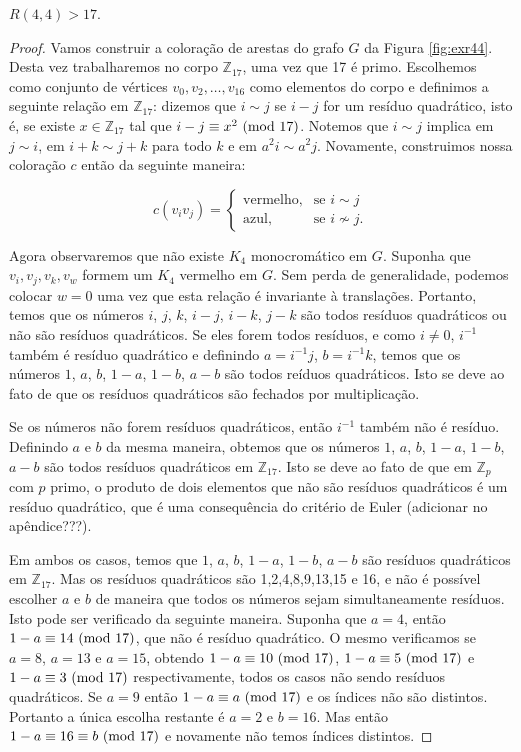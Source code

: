 \begin{proposition}
\label{thm:exr44}
$R(4,4) > 17$.
\end{proposition}
\begin{proof}
Vamos construir a coloração de arestas do grafo $G$ da Figura \ref{fig:exr44}. Desta vez trabalharemos no corpo $\mathbb{Z}_{17}$, uma vez que 17 é primo. Escolhemos como conjunto de vértices $v_0, v_2, \dots, v_{16}$ como elementos do corpo e definimos a seguinte relação em $\mathbb{Z}_{17}$: dizemos que $i \sim j$ se $ i - j $ for um resíduo quadrático, isto é, se existe $x \in \mathbb{Z}_{17}$ tal que $i - j \equiv x^2 \ (\text{mod}\ 17)$.
Notemos que $i \sim j$ implica em $ j \sim i$, em $i + k \sim j + k$ para todo $k$ e em $a^2 i \sim a^2 j$. Novamente, construimos nossa coloração $c$ então da seguinte maneira:

\[c(v_i v_j) = \begin{cases}
  \text{vermelho}, & \text{se } i \sim j \\
  \text{azul}, & \text{se } i \not\sim j.
\end{cases}\]

Agora observaremos que não existe $K_4$ monocromático em $G$. Suponha que $v_i, v_j, v_k, v_w$ formem um $K_4$ vermelho em $G$. Sem perda de generalidade, podemos colocar $w = 0$ uma vez que esta relação é invariante à translações. Portanto, temos que os números $i$, $j$, $k$, $i - j$, $i - k$, $j - k$ são todos resíduos quadráticos ou não são resíduos quadráticos.
Se eles forem todos resíduos, e como $i \neq 0$, $i^{-1}$ também é resíduo quadrático e definindo $a = i^{-1}j$, $b = i^{-1}k$, temos que os números $1$, $a$, $b$, $1 - a$, $1- b$, $a - b$ são todos reíduos quadráticos. Isto se deve ao fato de que os resíduos quadráticos são fechados por multiplicação.

Se os números não forem resíduos quadráticos, então $i^{-1}$ também não é resíduo. Definindo $a$ e $b$ da mesma maneira, obtemos que os números $1$, $a$, $b$, $1 - a$, $1- b$, $a - b$ são todos resíduos quadráticos em $\mathbb{Z}_{17}$. Isto se deve ao fato de que em $\mathbb{Z}_{p}$ com $p$ primo, o produto de dois elementos que não são resíduos quadráticos é um resíduo quadrático, que é uma consequência do critério de Euler (adicionar no apêndice???).

Em ambos os casos, temos que $1$, $a$, $b$, $1 - a$, $1- b$, $a - b$ são resíduos quadráticos em $\mathbb{Z}_{17}$. Mas os resíduos quadráticos são 1,2,4,8,9,13,15 e 16, e não é possível escolher $a$ e $b$ de maneira que todos os números sejam simultaneamente resíduos. Isto pode ser verificado da seguinte maneira. Suponha que $a = 4$, então $1 - a \equiv 14 \ (\text{mod}\ 17)$, que não é resíduo quadrático.
O mesmo verificamos se $a = 8$, $a = 13$ e $a = 15$, obtendo $1 - a \equiv 10 \ (\text{mod}\ 17)$, $1 - a \equiv 5 \ (\text{mod}\ 17)$ e $1 - a \equiv 3 \ (\text{mod}\ 17)$ respectivamente, todos os casos não sendo resíduos quadráticos. Se $a = 9$ então $1 - a \equiv a \ (\text{mod}\ 17)$ e os índices não são distintos.
Portanto a única escolha restante é $a = 2$ e $b = 16$. Mas então $1 - a \equiv 16 \equiv b \ (\text{mod}\ 17)$ e novamente não temos índices distintos.
\end{proof}
